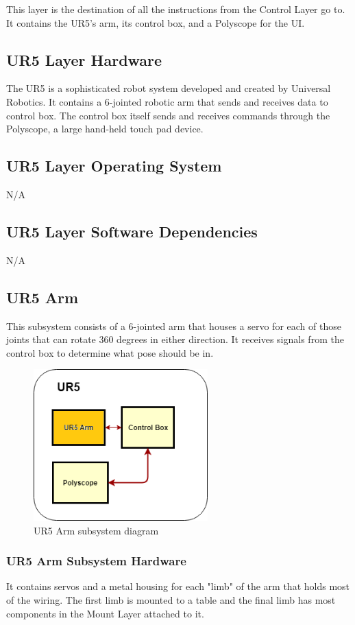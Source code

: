 This layer is the destination of all the instructions from the Control Layer go to. It contains the UR5's arm, its control box, and a Polyscope for the UI.

\subsection{UR5 Layer Hardware}
The UR5 is a sophisticated robot system developed and created by Universal Robotics. It contains a 6-jointed robotic arm that sends and receives data to control box. The control box itself sends and receives commands through the Polyscope, a large hand-held touch pad device.

\subsection{UR5 Layer Operating System}
N/A

\subsection{UR5 Layer Software Dependencies}
N/A

\subsection{UR5 Arm}
This subsystem consists of a 6-jointed arm that houses a servo for each of those joints that can rotate 360 degrees in either direction.  It receives signals from the control box to determine what pose should be in.

\begin{figure}[h!]
	\centering
 	\includegraphics[width=0.60\textwidth]{images/UR5_Layer_UR5_Arm}
 \caption{UR5 Arm subsystem diagram}
\end{figure}

\subsubsection{UR5 Arm Subsystem Hardware}
It contains servos and a metal housing for each "limb" of the arm that holds most of the wiring. The first limb is mounted to a table and the final limb has most components in the Mount Layer attached to it.

